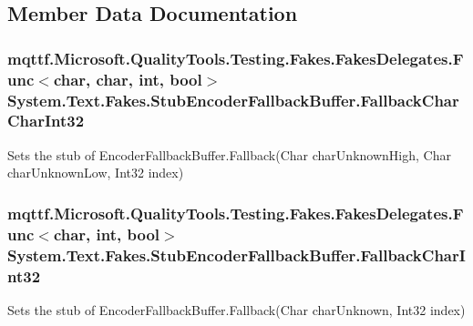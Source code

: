 \subsection{Member Data Documentation}
\hypertarget{class_system_1_1_text_1_1_fakes_1_1_stub_encoder_fallback_buffer_ad25c6694376c67a7dec7e3322d1653ee}{
\subsubsection[{Fallback\-Char\-Char\-Int32}]{\setlength{\rightskip}{0pt plus 5cm}mqttf.\-Microsoft.\-Quality\-Tools.\-Testing.\-Fakes.\-Fakes\-Delegates.\-Func$<$char, char, int, bool$>$ System.\-Text.\-Fakes.\-Stub\-Encoder\-Fallback\-Buffer.\-Fallback\-Char\-Char\-Int32}}\label{class_system_1_1_text_1_1_fakes_1_1_stub_encoder_fallback_buffer_ad25c6694376c67a7dec7e3322d1653ee}


Sets the stub of Encoder\-Fallback\-Buffer.\-Fallback(\-Char char\-Unknown\-High, Char char\-Unknown\-Low, Int32 index)

\hypertarget{class_system_1_1_text_1_1_fakes_1_1_stub_encoder_fallback_buffer_a6809a08ed826a0412889bd03d68bd513}{
\subsubsection[{Fallback\-Char\-Int32}]{\setlength{\rightskip}{0pt plus 5cm}mqttf.\-Microsoft.\-Quality\-Tools.\-Testing.\-Fakes.\-Fakes\-Delegates.\-Func$<$char, int, bool$>$ System.\-Text.\-Fakes.\-Stub\-Encoder\-Fallback\-Buffer.\-Fallback\-Char\-Int32}}\label{class_system_1_1_text_1_1_fakes_1_1_stub_encoder_fallback_buffer_a6809a08ed826a0412889bd03d68bd513}


Sets the stub of Encoder\-Fallback\-Buffer.\-Fallback(\-Char char\-Unknown, Int32 index)

